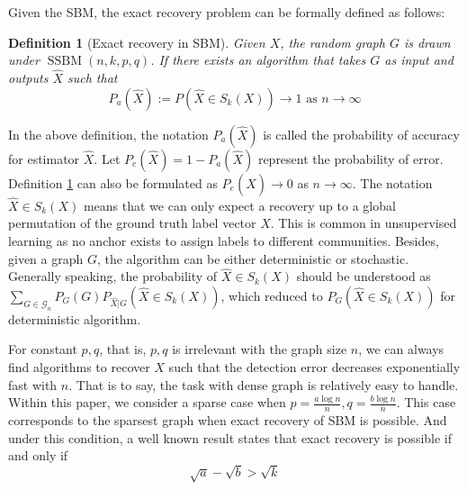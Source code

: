 \documentclass[journal]{IEEEtran}
\newtheorem{definition}{Definition}
\newcommand{\A}{\frac{a \log n}{n}}
\newcommand{\B}{\frac{b \log n}{n}}
\newcommand{\cG}{\mathcal{G}}
\newcommand{\1}{\mathbbm{1}}
\DeclareMathOperator{\SSBM}{SSBM}
\begin{document}
Given the SBM, the exact recovery problem can be formally defined as follows:
\begin{definition}[Exact recovery in SBM] \label{def:SSBMR}
Given $X$, the random graph $G$ is drawn under $\SSBM(n,k,p,q)$. If there exists an algorithm that takes
$G$ as input and outputs $\hat{X}$ such that
\begin{equation*}
P_a(\hat{X}):=P(\hat{X} \in S_k(X)) \to 1 \textrm{ as } n \to \infty
\end{equation*}
\end{definition}

In the above definition, the notation $P_a(\hat{X})$ is called the probability of accuracy for estimator $\hat{X}$.
Let $P_e(\hat{X}) = 1 - P_a(\hat{X})$ represent the probability of error. Definition \ref{def:SSBMR} can also
be formulated as $P_e(\hat{X}) \to 0$ as $n\to \infty$.
The notation $\hat{X} \in S_k(X)$ means that we can only
expect a recovery up to a global permutation of the ground truth label vector $X$. This is common in unsupervised
learning as no anchor exists to assign labels to different communities.
Besides, given a graph $G$, the algorithm can
be either deterministic or stochastic. Generally speaking, the probability of $\hat{X} \in S_k(X)$ should be understood as 
$\sum_{G \in \cG_n} P_G(G) P_{\hat{X}|G}(\hat{X} \in S_k(X))$, which reduced to 
$P_G(\hat{X} \in S_k(X))$ for deterministic algorithm.

For constant $p,q$, that is, $p,q$ is irrelevant with the graph size $n$,
we can always find algorithms to recover $X$ such that the detection error decreases exponentially
fast with $n$.
That is to say, the task with dense graph is relatively easy to handle. Within this paper, we consider a sparse
case when $p = \A, q = \B$. This case corresponds to the sparsest graph when exact recovery of SBM is possible.
And under this condition, a well known result \cite{abbe2015community} states that
exact recovery is possible if and only if
\begin{equation}\label{eq:abk}
\sqrt{a} - \sqrt{b} > \sqrt{k}
\end{equation}
\end{document}
